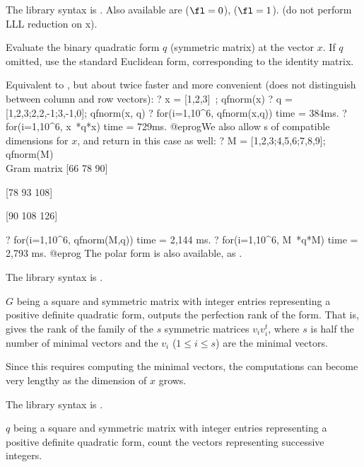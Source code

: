 The library syntax is .
Also available are
 ($\fl=0$),
 ($\fl=1$).
 (do not perform LLL
reduction on x).

\label{se:qfnorm}
Evaluate the binary quadratic form $q$ (symmetric matrix)
at the vector $x$. If $q$ omitted, use the standard Euclidean form,
corresponding to the identity matrix.

Equivalent to , but about twice faster and
more convenient (does not distinguish between column and row vectors):
\bprog
? x = [1,2,3]~; qfnorm(x)
? q = [1,2,3;2,2,-1;3,-1,0]; qfnorm(x, q)
? for(i=1,10^6, qfnorm(x,q))
time = 384ms.
? for(i=1,10^6, x~*q*x)
time = 729ms.
@eprog\noindent We also allow s of compatible dimensions for $x$,
and return  in this case as well:
\bprog
? M = [1,2,3;4,5,6;7,8,9]; qfnorm(M) \\ Gram matrix
[66  78  90]

[78  93 108]

[90 108 126]

? for(i=1,10^6, qfnorm(M,q))
time = 2,144 ms.
? for(i=1,10^6, M~*q*M)
time = 2,793 ms.
@eprog
\noindent The polar form is also available, as .

The library syntax is .

\label{se:qfperfection}
$G$ being a square and symmetric matrix with
integer entries representing a positive definite quadratic form, outputs the
perfection rank of the form. That is, gives the rank of the family of the $s$
symmetric matrices $v_iv_i^t$, where $s$ is half the number of minimal
vectors and the $v_i$ ($1\le i\le s$) are the minimal vectors.

Since this requires computing the minimal vectors, the computations can
become very lengthy as the dimension of $x$ grows.

The library syntax is .

\label{se:qfrep}
$q$ being a square and symmetric matrix with integer entries representing a
positive definite quadratic form, count the vectors representing successive
integers.

